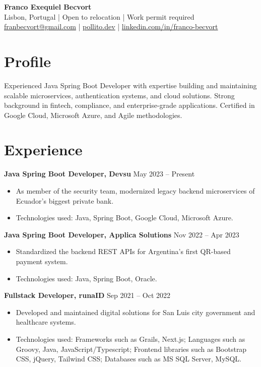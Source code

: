 \documentclass[10pt, letterpaper]{article}
\begin{document}
\begin{center}
    {\LARGE\bfseries Franco Exequiel Becvort} \\
    Lisbon, Portugal | Open to relocation | Work permit required \\
    \href{mailto:franbecvort@gmail.com}{franbecvort@gmail.com} | 
    \href{https://pollito.dev/}{pollito.dev} | 
    \href{https://linkedin.com/in/franco-becvort}{linkedin.com/in/franco-becvort} \\
\end{center}

\vspace{5pt}

\section{Profile}
Experienced Java Spring Boot Developer with expertise building and maintaining scalable microservices, authentication systems, and cloud solutions. Strong background in fintech, compliance, and enterprise-grade applications. Certified in Google Cloud, Microsoft Azure, and Agile methodologies.

\section{Experience}
\textbf{Java Spring Boot Developer, Devsu} \hfill May 2023 – Present \
\begin{itemize}[leftmargin=10pt, noitemsep]
    \item As member of the security team, modernized legacy backend microservices of Ecuador's biggest private bank.
    \item Technologies used: Java, Spring Boot, Google Cloud, Microsoft Azure.
\end{itemize}

\textbf{Java Spring Boot Developer, Applica Solutions} \hfill Nov 2022 – Apr 2023 \
\begin{itemize}[leftmargin=10pt, noitemsep]
    \item Standardized the backend REST APIs for Argentina’s first QR-based payment system.
    \item Technologies used: Java, Spring Boot, Oracle.
\end{itemize}

\textbf{Fullstack Developer, runaID} \hfill Sep 2021 – Oct 2022 \
\begin{itemize}[leftmargin=10pt, noitemsep]
    \item Developed and maintained digital solutions for San Luis city government and healthcare systems.
    \item Technologies used: Frameworks such as Grails, Next.js; Languages such as Groovy, Java, JavaScript/Typescript; Frontend libraries such as Bootstrap CSS, jQuery, Tailwind CSS; Databases such as MS SQL Server, MySQL.
\end{itemize}
\end{document}
